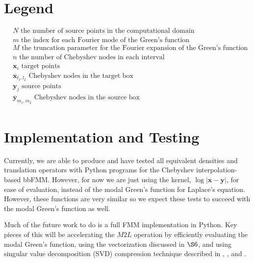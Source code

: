 \documentclass[11pt, oneside]{article}   	%
\begin{document}
\begin{appendices}
\section{Legend}
\begin{align*}
&N \mbox{ the number of source points in the computational domain}\\
&m \mbox{ the index for each Fourier mode of the Green's function}\\
&M \mbox{ the truncation parameter for the Fourier expansion of the Green's function}\\
&n \mbox{ the number of Chebyshev nodes in each interval}\\
&\mathbf{x}_i\mbox{ target points}\\
&\mathbf{\overline{x}}_{l_1,l_2}\mbox{ Chebyshev nodes in the target box}\\
&\mathbf{y}_j\mbox{ source points}\\
&\mathbf{\overline{y}}_{m_1,m_2}\mbox{ Chebyshev nodes in the source box}\\
\end{align*}

\section{Implementation and Testing}
Currently, we are able to produce and have tested all equivalent densities and translation operators with Python programs for the Chebyshev interpolation-based bbFMM. However, for now we are just using the kernel, $\log|\mathbf{x}-\mathbf{y}|$, for ease of evaluation, instead of the modal Green's function for Laplace's equation. However, these functions are very similar so we expect these tests to succeed with the modal Green's function as well.

Much of the future work to do is a full FMM implementation in Python. Key pieces of this will be accelerating the $M2L$ operation by efficiently evaluating the modal Green's function, using the vectorization discussed in $\S6$, and using singular value decomposition (SVD) compression technique described in \cite{CGMR}, \cite{FD}, \cite{ZGR} and \cite{MV}.


\end{appendices}
\end{document}
